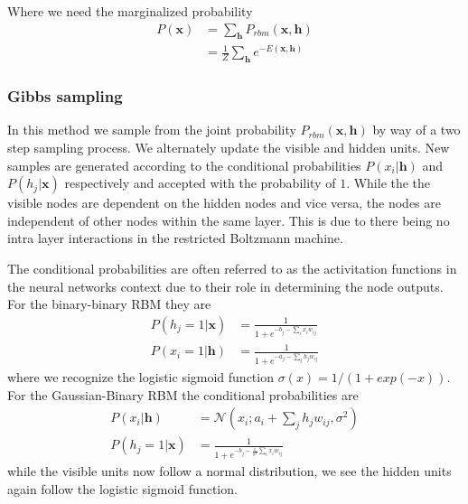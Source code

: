\documentclass[norsk,a4paper,11pt]{article}
\newcommand{\Vx}{\mathbf{x}}
\newcommand{\Vh}{\mathbf{h}}
\begin{document}
Where we need the marginalized probability
\begin{align}
	P(\bm{x})  &= \sum_\mathbf{h} P_{rbm}(\mathbf{x}, \mathbf{h}) \\
				&= \frac{1}{Z}\sum_\mathbf{h} e^{-E(\mathbf{x}, \mathbf{h})}
\end{align}

\subsubsection{Gibbs sampling}
In this method we sample from the joint probability $P_{rbm} (\Vx, \Vh)$ by way of a two step sampling process. We alternately update the visible and hidden units.
New samples are generated according to the conditional probabilities $P(x_i|\Vh)$ and $P(h_j|\Vx)$ respectively and accepted with the probability of $1$. While the the visible nodes are dependent on the hidden nodes and vice versa, the nodes are independent of other nodes within the same layer. This is due to there being no intra layer interactions in the restricted Boltzmann machine.

The conditional probabilities are often referred to as the activitation functions in the neural networks context due to their role in determining the node outputs. For the binary-binary RBM they are
\begin{align}
	P(h_j = 1 | \bm{x}) &= \frac{1}{1 + e^{-b_j - \sum_i x_i w_{ij}}} \\
	P(x_i = 1 | \bm{h}) &= \frac{1}{1 + e^{-a_j - \sum_j h_j w_{ij}}}
\end{align}
where we recognize the logistic sigmoid function $\sigma (x) = 1/(1+exp(-x))$.
For the Gaussian-Binary RBM the conditional probabilities are
\begin{align}
	P(x_i|\mathbf{h}) &= \mathcal{N}(x_i; a_i+ \sum_j h_j w_{ij}, \sigma^2) \\
	P(h_j=1|\mathbf{x}) &=  \frac{1}{1+e^{-b_j-\frac{1}{\sigma^2} \sum_i x_i w_{ij}}}
\end{align}
while the visible units now follow a normal distribution, we see the hidden units again follow the logistic sigmoid function.
\end{document}
